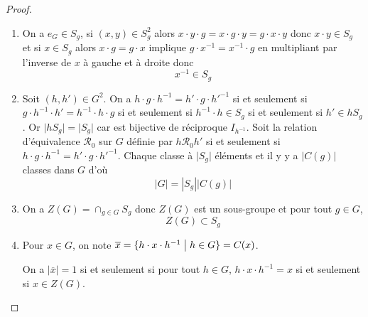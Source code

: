 \begin{proof}
	\phantom{}
	\begin{enumerate}
		\item On a $e_{G}\in S_{g}$, si $(x,y)\in S_{g}^{2}$ alors $x\cdot y\cdot g=x\cdot g\cdot y=g\cdot x\cdot y$ donc $x\cdot y\in S_{g}$ et si $x\in S_{g}$ alors $x\cdot g=g\cdot x$ implique $g\cdot x^{-1}=x^{-1}\cdot g$ en multipliant par l'inverse de $x$ à gauche et à droite donc 
		\begin{equation}
			\boxed{x^{-1}\in S_{g}}
		\end{equation}
		
		\item Soit $(h,h')\in G^{2}$. On a $h\cdot g\cdot h^{-1}=h'\cdot g\cdot h'^{-1}$ si et seulement si $g\cdot h^{-1}\cdot h'=h^{-1}\cdot h\cdot g$ si et seulement si $h^{-1}\cdot h\in S_{g}$ si et seulement si $h'\in hS_{g}$. Or $\vert hS_{g}\vert=\vert S_{g}\vert$ car  est bijective de réciproque $I_{h^{-1}}$. Soit la relation d'équivalence $\mathcal{R}_{0}$ sur $G$ définie par $h\mathcal{R}_{0}h'$ si et seulement si $h\cdot g\cdot h^{-1}=h'\cdot g\cdot h'^{-1}$. Chaque classe à $\vert S_{g}\vert$ éléments et il y y a $\vert C(g)\vert$ classes dans $G$ d'où 
		\begin{equation}
			\boxed{\left\lvert G\right\rvert=\left\lvert S_{g}\right\rvert\left\lvert C(g)\right\rvert}
		\end{equation}
		
		\item On a $Z(G)=\cap_{g\in G}S_{g}$ donc $Z(G)$ est un sous-groupe et pour tout $g\in G$, 
		\begin{equation}
			\boxed{Z(G)\subset S_{g}}
		\end{equation}
		
		\item Pour $x\in G$, on note $\overline{x}=\{h\cdot x\cdot h^{-1}\bigm| h\in G\}=C(x)$. 
		
		On a $\vert\overline{x}\vert=1$ si et seulement si pour tout $h\in G$, $h\cdot x\cdot h^{-1}=x$ si et seulement si $x\in Z(G)$.
		

\end{enumerate}
\end{proof}
